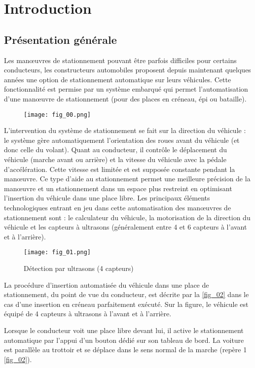 \section{Introduction}
\subsection{Présentation générale}
Les manœuvres de stationnement pouvant être parfois difficiles pour certains conducteurs, les constructeurs
automobiles proposent depuis maintenant quelques années une option de stationnement automatique sur leurs
véhicules. Cette fonctionnalité est permise par un système embarqué qui permet l’automatisation d’une manœuvre de stationnement (pour des places en créneau, épi ou bataille).

\begin{figure}[H]
\centering
\texttt{[image: fig\_00.png]}
\end{figure}

L’intervention du système de stationnement se fait sur la direction du véhicule : le système gère automatiquement l’orientation des roues avant du véhicule (et donc celle du volant). Quant au conducteur, il contrôle le
déplacement du véhicule (marche avant ou arrière) et la vitesse du véhicule avec la pédale d’accélération. Cette
vitesse est limitée et est supposée constante pendant la manœuvre.
Ce type d’aide au stationnement permet une meilleure précision de la manœuvre et un stationnement dans un
espace plus restreint en optimisant l’insertion du véhicule dans une place libre.
Les principaux éléments technologiques entrant en jeu dans cette automatisation des manœuvres de stationnement sont : le calculateur du véhicule, la motorisation de la direction du véhicule et les capteurs à ultrasons (généralement entre 4 et 6 capteurs à l’avant et à l’arrière).

\begin{figure}[H]
\centering
\texttt{[image: fig\_01.png]}
\caption{Détection par ultrasons (4 capteurs) \label{fig_01}}
\end{figure}

La procédure d’insertion automatisée du véhicule dans une place de stationnement, du point de vue du conducteur, est décrite par la \autoref{fig_02} dans le cas d’une insertion en créneau parfaitement exécuté. Sur la figure, le
véhicule est équipé de 4 capteurs à ultrasons à l’avant et à l’arrière.

Lorsque le conducteur voit une place libre devant lui, il active le stationnement automatique par l’appui d’un
bouton dédié sur son tableau de bord. La voiture est parallèle au trottoir et se déplace dans le sens normal de
la marche (repère 1 \autoref{fig_02}).

